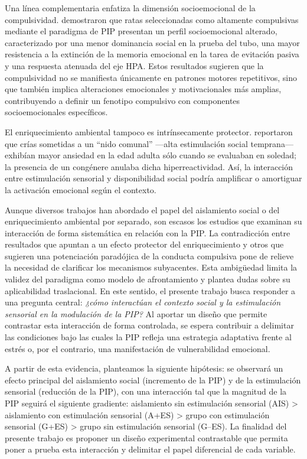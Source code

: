 \documentclass[12pt,a4paper]{article}
\begin{document}
\begin{multicols}{2}
Una línea complementaria enfatiza la dimensión socioemocional de la compulsividad. \citet{MartinGonzalez2022} demostraron que ratas seleccionadas como altamente compulsivas mediante el paradigma de PIP presentan un perfil socioemocional alterado, caracterizado por una menor dominancia social en la prueba del tubo, una mayor resistencia a la extinción de la memoria emocional en la tarea de evitación pasiva y una respuesta atenuada del eje HPA. Estos resultados sugieren que la compulsividad no se manifiesta únicamente en patrones motores repetitivos, sino que también implica alteraciones emocionales y motivacionales más amplias, contribuyendo a definir un fenotipo compulsivo con componentes socioemocionales específicos.

El enriquecimiento ambiental tampoco es intrínsecamente protector. \citet{Branchi2006} reportaron que crías sometidas a un “nido comunal” —alta estimulación social temprana— exhibían mayor ansiedad en la edad adulta sólo cuando se evaluaban en soledad; la presencia de un congénere anulaba dicha hiperreactividad. Así, la interacción entre estimulación sensorial y disponibilidad social podría amplificar o amortiguar la activación emocional según el contexto.

Aunque diversos trabajos han abordado el papel del aislamiento social o del enriquecimiento ambiental por separado, son escasos los estudios que examinan su interacción de forma sistemática en relación con la PIP. La contradicción entre resultados que apuntan a un efecto protector del enriquecimiento y otros que sugieren una potenciación paradójica de la conducta compulsiva pone de relieve la necesidad de clarificar los mecanismos subyacentes. Esta ambigüedad limita la validez del paradigma como modelo de afrontamiento y plantea dudas sobre su aplicabilidad traslacional. En este sentido, el presente trabajo busca responder a una pregunta central: \textit{¿cómo interactúan el contexto social y la estimulación sensorial en la modulación de la PIP?} Al aportar un diseño que permite contrastar esta interacción de forma controlada, se espera contribuir a delimitar las condiciones bajo las cuales la PIP refleja una estrategia adaptativa frente al estrés o, por el contrario, una manifestación de vulnerabilidad emocional.

A partir de esta evidencia, planteamos la siguiente hipótesis: se observará un efecto principal del aislamiento social (incremento de la PIP) y de la estimulación sensorial (reducción de la PIP), con una interacción tal que la magnitud de la PIP seguirá el siguiente gradiente: aislamiento sin estimulación sensorial (AIS) > aislamiento con estimulación sensorial (A+ES) > grupo con estimulación sensorial (G+ES) > grupo sin estimulación sensorial (G–ES). La finalidad del presente trabajo es proponer un diseño experimental contrastable que permita poner a prueba esta interacción y delimitar el papel diferencial de cada variable.


\end{multicols}
\end{document}

